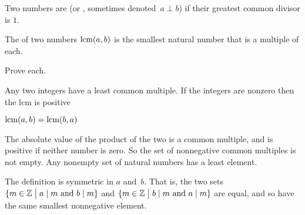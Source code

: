 \documentclass{ibl}  %
\begin{document}
\begin{df}
Two numbers are  
(or , sometimes denoted~$a\perp b$) if their 
greatest common divisor is $1$.
\end{df}

\begin{df}
The  of two numbers $\operatorname{lcm}(a,b)$ 
is the smallest natural number that is a multiple of each.
\end{df}

\begin{problem} Prove each.
\begin{items}
\item {} Any two integers have a least common multiple.
  If the integers are nonzero then the lcm is positive
\item {} $\operatorname{lcm}(a,b)=\operatorname{lcm}(b,a)$
\end{items}
\begin{answer}
\begin{items}
\item The absolute value of the product of the two is a common multiple,
  and is positive if neither number is zero.
  So the set of nonnegative common multiples is not empty.
  Any nonempty set of natural numbers has a least element.
\item The definition is symmetric in $a$ and~$b$.
  That is, the two sets
  $\{m\in\mathbb{Z} \bigm| \text{$a\mid m$ and $b\mid m$}\}$
  and     
  $\{m\in\mathbb{Z} \bigm| \text{$b\mid m$ and $a\mid m$}\}$
  are equal, and so have the same smallest nonnegative element.
\end{items}
\end{answer}
\end{problem}
\end{document}

